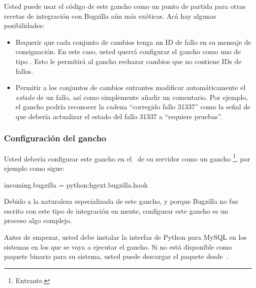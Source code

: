 Usted puede usar el código de este gancho como un punto de partida
para otras recetas de integración con Bugzilla aún más exóticas. Acá
hay algunas posibilidades:
\begin{itemize}
\item Requerir que cada conjunto de cambios tenga un ID de fallo en su
  mensaje de consignación. En este caso, usted querrá configurar el
  gancho como uno de tipo .  Esto le permitirá al
  gancho rechazar cambios que no contiene IDs de fallos.
\item Permitir a los conjuntos de cambios entrantes modificar
  automáticamente el \emph{estado} de un fallo, así como simplemente
  añadir un comentario. Por ejemplo, el gancho podría reconocer la
  cadena ``corregido fallo 31337'' como la señal de que debería
  actualizar el estado del fallo 31337 a ``requiere pruebas''.
\end{itemize}

\subsubsection{Configuración del gancho }
\label{sec:hook:bugzilla:config}

Usted debería configurar este gancho en el \hgrc\ de su servidor como
un gancho \footnote{Entrante.}, por ejemplo como sigue:
\begin{codesample2}
  [hooks]
  incoming.bugzilla = python:hgext.bugzilla.hook
\end{codesample2}

Debido a la naturaleza especializada de este gancho, y porque Bugzilla
no fue escrito con este tipo de integración en mente, configurar este
gancho es un proceso algo complejo.

Antes de empezar, usted debe instalar la interfaz de Python para MySQL
en los sistemas en los que se vaya a ejecutar el gancho. Si no está
disponible como paquete binario para su sistema, usted puede descargar
el paquete desde~\cite{web:mysql-python}.

